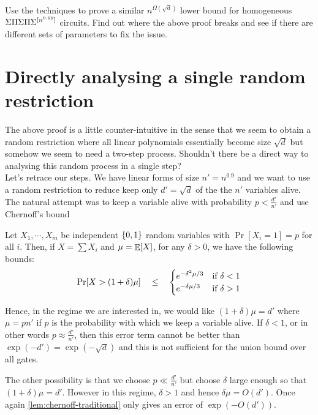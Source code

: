 \begin{exercise}
Use the techniques to prove a similar $n^{\Omega(\sqrt{d})}$ lower bound for homogeneous $\Sigma\Pi\Sigma\Pi\Sigma^{[n^{0.99}]}$ circuits. Find out where the above proof breaks and see if there are different sets of parameters to fix the issue. 
\end{exercise}

\section{Directly analysing a single random restriction}

The above proof is a little counter-intuitive in the sense that we seem to obtain a random restriction where all linear polynomials essentially become size $\sqrt{d}$ but somehow we seem to need a two-step process.
Shouldn't there be a direct way to analysing this random process in a single step? \\

Let's retrace our steps.
We have linear forms of size $n' = n^{0.9}$ and we want to use a random restriction to reduce keep only $d' = \sqrt{d}$ of the the $n'$ variables alive.
The natural attempt was to keep a variable alive with probability $p < \frac{d'}{n'}$ and use Chernoff's bound

\begin{lemma}\label{lem:chernoff-traditional}
Let $X_1,\cdots, X_m$ be independent $\left\{0,1\right\}$ random variables with $\Pr[X_i = 1] = p$ for all $i$. Then, if $X = \sum X_i$ and $\mu = \mathop{\mathbb{E}}[X]$, for any $\delta > 0$, we have the following bounds:
\[
\Pr[ X > (1 + \delta) \mu ] \quad \leq \quad \begin{cases}
e^{-\delta^2 \mu/3} & \text{if }\delta < 1\\
e^{-\delta \mu/3} & \text{if }\delta > 1
\end{cases}
\]
\end{lemma}
Hence, in the regime we are interested in, we would like $(1+\delta)\mu = d'$ where $\mu = p n'$ if $p$ is the probability with which we keep a variable alive. If $\delta < 1$, or in other words $p \approx \frac{d'}{n'}$, then this error term cannot be better than $\exp(-d') = \exp(-\sqrt{d})$ and this is not sufficient for the union bound over all gates. 

The other possibility is that we choose $p \ll \frac{d'}{n'}$ but choose $\delta$ large enough so that $(1+ \delta)\mu = d'$.
However in this regime, $\delta > 1$ and hence $\delta\mu = O(d')$.
Once again \autoref{lem:chernoff-traditional} only gives an error of $\exp(-O(d'))$.

